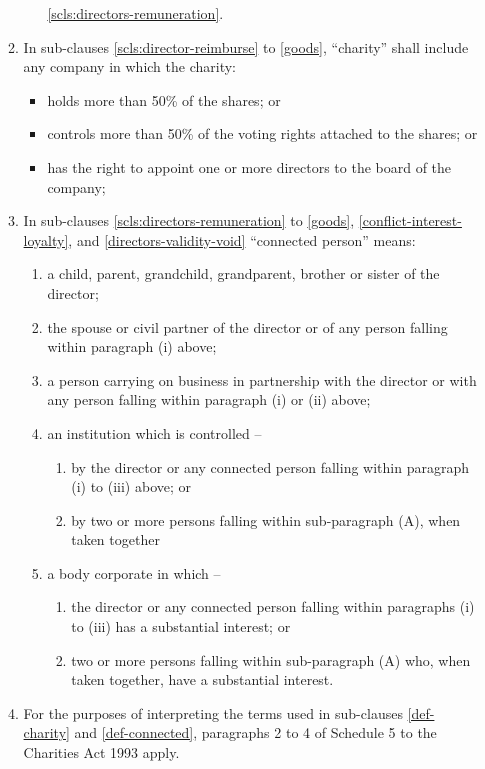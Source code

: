\begin{enumerate}
\begin{enumerate}
\begin{enumerate}
      \ref{scls:directors-remuneration}.
    \end{enumerate}
  \item \label{def-charity}
    In sub-clauses \ref{scls:director-reimburse} to \ref{goods}, ``charity'' shall include
    any company in which the charity:
    \begin{itemize}
    \item
      holds more than 50\% of the shares; or
    \item
      controls more than 50\% of the voting rights attached to the
      shares; or
    \item
      has the right to appoint one or more directors to the board of the
      company;
    \end{itemize}
  \item \label{def-connected}
    In sub-clauses \ref{scls:directors-remuneration} to \ref{goods}, \ref{conflict-interest-loyalty},
    and \ref{directors-validity-void} ``connected person'' means:
    \begin{enumerate}
    \item
      \label{art:connected-child} a child, parent, grandchild,
      grandparent, brother or sister of the director;
    \item
      \label{art:connected-spouse} the spouse or civil partner of the
      director or of any person falling within paragraph (i) above;
    \item
      \label{art:connected-business} a person carrying on business in
      partnership with the director or with any person falling within
      paragraph (i) or (ii) above;
    \item
      an institution which is controlled –
      \begin{enumerate}
      \item
        by the director or any connected person falling within paragraph (i) to (iii) above; or
      \item
        by two or more persons falling within sub-paragraph (A), when taken
        together
      \end{enumerate}
    \item
      a body corporate in which –
      \begin{enumerate}
        \item
            the director or any connected person falling within paragraphs (i) to (iii) has a substantial interest; or
        \item
            two or more persons falling within sub-paragraph (A) who, when
            taken together, have a substantial interest.
      \end{enumerate}
    \end{enumerate}
  \item
    For the purposes of interpreting the terms used in sub-clauses \ref{def-charity}
    and \ref{def-connected}, paragraphs 2 to 4 of Schedule 5 to the Charities Act 1993
    apply.
  \end{enumerate}


\end{enumerate}
